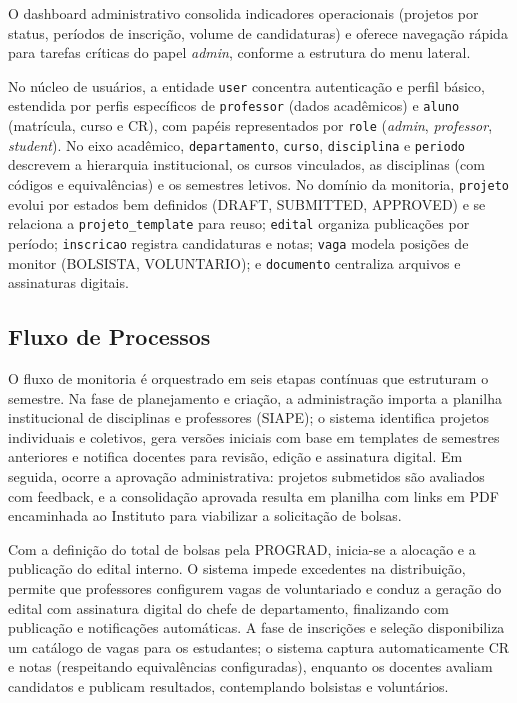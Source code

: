 \documentclass[portuguese]{sbc2025}%
\begin{document}
O dashboard administrativo consolida indicadores operacionais (projetos por status, períodos de inscrição, volume de candidaturas) e oferece navegação rápida para tarefas críticas do papel \textit{admin}, conforme a estrutura do menu lateral.

No núcleo de usuários, a entidade \texttt{user} concentra autenticação e perfil básico, estendida por perfis específicos de \texttt{professor} (dados acadêmicos) e \texttt{aluno} (matrícula, curso e CR), com papéis representados por \texttt{role} (\textit{admin}, \textit{professor}, \textit{student}). No eixo acadêmico, \texttt{departamento}, \texttt{curso}, \texttt{disciplina} e \texttt{periodo} descrevem a hierarquia institucional, os cursos vinculados, as disciplinas (com códigos e equivalências) e os semestres letivos. No domínio da monitoria, \texttt{projeto} evolui por estados bem definidos (DRAFT, SUBMITTED, APPROVED) e se relaciona a \texttt{projeto\_template} para reuso; \texttt{edital} organiza publicações por período; \texttt{inscricao} registra candidaturas e notas; \texttt{vaga} modela posições de monitor (BOLSISTA, VOLUNTARIO); e \texttt{documento} centraliza arquivos e assinaturas digitais.

\subsection{Fluxo de Processos}

O fluxo de monitoria é orquestrado em seis etapas contínuas que estruturam o semestre. Na fase de planejamento e criação, a administração importa a planilha institucional de disciplinas e professores (SIAPE); o sistema identifica projetos individuais e coletivos, gera versões iniciais com base em templates de semestres anteriores e notifica docentes para revisão, edição e assinatura digital. Em seguida, ocorre a aprovação administrativa: projetos submetidos são avaliados com feedback, e a consolidação aprovada resulta em planilha com links em PDF encaminhada ao Instituto para viabilizar a solicitação de bolsas.

Com a definição do total de bolsas pela PROGRAD, inicia-se a alocação e a publicação do edital interno. O sistema impede excedentes na distribuição, permite que professores configurem vagas de voluntariado e conduz a geração do edital com assinatura digital do chefe de departamento, finalizando com publicação e notificações automáticas. A fase de inscrições e seleção disponibiliza um catálogo de vagas para os estudantes; o sistema captura automaticamente CR e notas (respeitando equivalências configuradas), enquanto os docentes avaliam candidatos e publicam resultados, contemplando bolsistas e voluntários.
\end{document}
